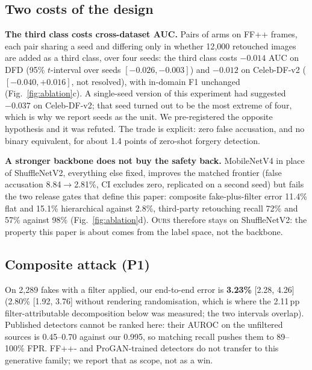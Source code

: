 \documentclass[conference]{IEEEtran}
\newcommand{\ours}{\textsc{Ours}}
\newcommand{\win}[1]{\textbf{#1}}
\begin{document}
\subsection{Two costs of the design}
\label{sec:cost}
\textbf{The third class costs cross-dataset AUC.} Pairs of arms on FF++ frames, each pair sharing a
seed and differing only in whether 12{,}000 retouched images are added as a third class, over four
seeds: the third class costs $-0.014$ AUC on DFD (95\% $t$-interval over seeds $[-0.026,-0.003]$)
and $-0.012$ on Celeb-DF-v2 ($[-0.040,+0.016]$, not resolved), with in-domain F1 unchanged
(Fig.~\ref{fig:ablation}c). A single-seed version of this experiment had suggested $-0.037$ on
Celeb-DF-v2; that seed turned out to be the most extreme of four, which is why we report seeds as the
unit. We pre-registered the opposite hypothesis and it was refuted. The trade is explicit: zero false
accusation, and no binary equivalent, for about 1.4 points of zero-shot forgery detection.

\textbf{A stronger backbone does not buy the safety back.} MobileNetV4 in place of
ShuffleNetV2, everything else fixed, improves the matched frontier (false accusation
8.84$\to$2.81\%, CI excludes zero, replicated on a second seed) but fails the two release gates
that define this paper: composite fake-plus-filter error 11.4\% flat and 15.1\% hierarchical
against 2.8\%, third-party retouching recall 72\% and 57\% against 98\%
(Fig.~\ref{fig:ablation}d). \ours{} therefore stays on ShuffleNetV2: the property this paper is
about comes from the label space, not the backbone.

\subsection{Composite attack (P1)}
\label{sec:p1}
On 2{,}289 fakes with a filter applied, our end-to-end error is \win{3.23\%} [2.28, 4.26]
(2.80\% [1.92, 3.76] without rendering randomisation, which is where the 2.11\,pp
filter-attributable decomposition below was measured; the two intervals overlap). Published detectors cannot be ranked here: their
AUROC on the unfiltered sources is 0.45--0.70 against our 0.995, so matching recall pushes
them to 89--100\% FPR. FF++- and ProGAN-trained detectors do not transfer to this generative
family; we report that as scope, not as a win.
\end{document}
